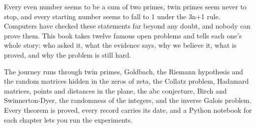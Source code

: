 Every even number seems to be a sum of two primes, twin primes seem never to stop, and every starting number
seems to fall to 1 under the 3n+1 rule. Computers have checked these statements far beyond any doubt, and nobody
can prove them. This book takes twelve famous open problems and tells each one's whole story: who asked it,
what the evidence says, why we believe it, what is proved, and why the problem is still hard.

The journey runs through twin primes, Goldbach, the Riemann hypothesis and the random matrices hidden in the
zeros of zeta, the Collatz problem, Hadamard matrices, points and distances in the plane, the abc conjecture,
Birch and Swinnerton-Dyer, the randomness of the integers, and the inverse Galois problem. Every theorem is
proved, every record carries its date, and a Python notebook for each chapter lets you run the experiments.
